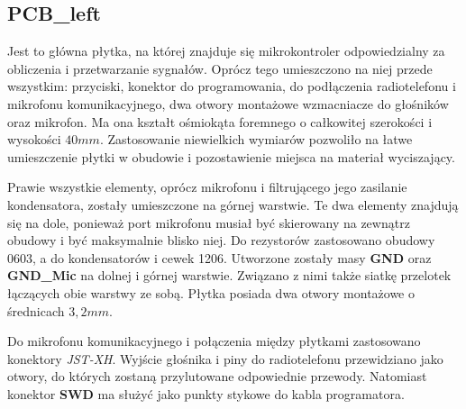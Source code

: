 \subsection{PCB\_left}

Jest to główna płytka, na której znajduje się mikrokontroler odpowiedzialny za obliczenia i przetwarzanie sygnałów. Oprócz tego umieszczono na niej przede wszystkim: przyciski, konektor do programowania, do podłączenia radiotelefonu i mikrofonu komunikacyjnego, dwa otwory montażowe wzmacniacze do głośników oraz mikrofon. Ma ona kształt ośmiokąta foremnego o całkowitej szerokości i wysokości $40mm$. Zastosowanie niewielkich wymiarów pozwoliło na łatwe umieszczenie płytki w obudowie i pozostawienie miejsca na materiał wyciszający.

Prawie wszystkie elementy, oprócz mikrofonu i filtrującego jego zasilanie kondensatora, zostały umieszczone na górnej warstwie. Te dwa elementy znajdują się na dole, ponieważ port mikrofonu musiał być skierowany na zewnątrz obudowy i być maksymalnie blisko niej. Do rezystorów zastosowano obudowy 0603, a do kondensatorów i cewek 1206. Utworzone zostały masy \textbf{GND} oraz \textbf{GND\_Mic} na dolnej i górnej warstwie. Związano z nimi także siatkę przelotek łączących obie warstwy ze sobą. Płytka posiada dwa otwory montażowe o średnicach $3,2mm$.

Do mikrofonu komunikacyjnego i połączenia między płytkami zastosowano konektory \textit{JST-XH}. Wyjście głośnika i piny do radiotelefonu przewidziano jako otwory, do których zostaną przylutowane odpowiednie przewody. Natomiast konektor \textbf{SWD} ma służyć jako punkty stykowe do kabla programatora.


